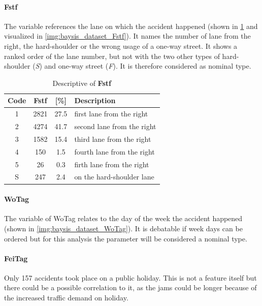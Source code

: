 \paragraph{Fstf}
\label{baysis_dataset_Fstf}
The variable references the lane on which the accident happened (shown in \cref{tbl:baysis_dataset_Fstf} and visualized in \cref{img:baysis_dataset_Fstf}). It names the number of lane from the right, the hard-shoulder or the wrong usage of a one-way street. It shows a ranked order of the lane number, but not with the two other types of hard-shoulder (\textit{S}) and one-way street (\textit{F}). It is therefore considered as nominal type.
\begin{table}[ht]
	\centering
	\small
	\begin{tabular}{c|c|c|l}
		\toprule
		Code & \textbf{Fstf} & [\%] & Description \\ 
		\midrule  
		1 & 2821 	& 27.5 	& first lane from the right \\
		2 & 4274 	& 41.7 	& second lane from the right \\
		3 & 1582 	& 15.4 	& third lane from the right \\
		4 & 150 	& 1.5 	& fourth lane from the right \\
		5 & 26 		& 0.3 	& firth lane from the right \\ 
 		S & 247 	& 2.4 	& on the hard-shoulder lane \\ 
		\bottomrule
	\end{tabular}
	\caption{Descriptive of \textbf{Fstf}}
	\label{tbl:baysis_dataset_Fstf}
	\vspace{-8mm}
\end{table} 
\paragraph{WoTag}
\label{baysis_dataset_WoTag}
The variable of WoTag relates to the day of the week the accident happened (shown in \cref{img:baysis_dataset_WoTag}). It is debatable if week days can be ordered but for this analysis the parameter will be considered a nominal type.
\paragraph{FeiTag}
\label{baysis_dataset_FeiTag}
Only 157 accidents took place on a public holiday. This is not a feature itself but there could be a possible correlation to it, as the jams could be longer because of the increased traffic demand on holiday.

